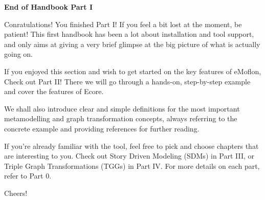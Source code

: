\newpage
\noHeader

\vspace*{2cm}

{\bf \large End of Handbook Part I }
\vspace{0.5cm}

Conratulations! You finished Part I! If you feel a bit lost at the moment, be patient! This first handbook has been a lot about installation and tool support, and only aims at giving a very brief glimpse at the big picture of what is actually going on.  

If you enjoyed this section and wish to get started on the key features of eMoflon, Check out Part II! There we will go through a hands-on, step-by-step example and cover the features of Ecore.

We shall also introduce clear and simple definitions for the most important metamodelling and graph transformation concepts, always referring to the concrete example and providing references for further reading.

If you're already familiar with the tool, feel free to pick and choose chapters that are interesting to you. Check out Story Driven Modeling (SDMs) in Part III, or Triple Graph Transformations (TGGs) in Part IV. For more details on each part, refer to Part 0.

Cheers!

\newpage
\mbox{}